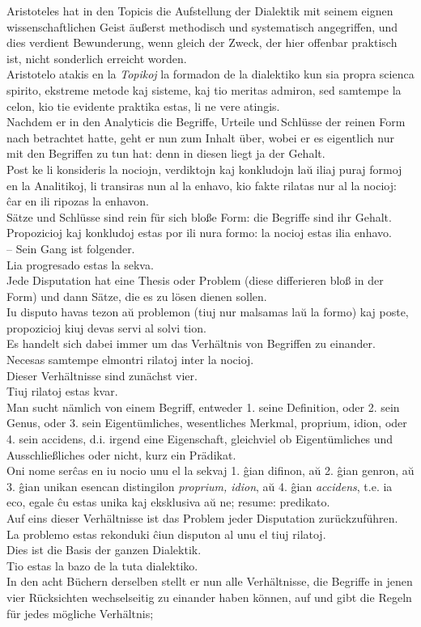 \documentclass{book}
\newcommand{\de}[1]{{\color{red}#1}\\}
\newcommand{\eo}[1]{#1\\}
\newcommand{\eble}[1]{{\color{blue}#1}}
\begin{document}
\de{Aristoteles hat in den Topicis die Aufstellung der Dialektik mit
seinem eignen wissenschaftlichen Geist äußerst methodisch und
systematisch angegriffen, und dies verdient Bewunderung, wenn gleich der
Zweck, der hier offenbar praktisch ist, nicht sonderlich erreicht
worden.}
\eo{Aristotelo atakis en la \textit{Topikoj} la formadon de la dialektiko
kun sia propra scienca spirito, ekstreme metode kaj sisteme, kaj tio
meritas admiron, sed samtempe la celon, kio tie evidente
praktika estas, li ne vere atingis.}
\de{Nachdem er in den Analyticis die Begriffe, Urteile und Schlüsse der
reinen Form nach betrachtet hatte, geht er nun zum Inhalt über, wobei er
es eigentlich nur mit den Begriffen zu tun hat: denn in diesen liegt ja
der Gehalt.}
\eo{Post ke li konsideris la nociojn, verdiktojn kaj konkludojn laŭ iliaj
puraj formoj en la Analitikoj, li transiras nun al la enhavo, kio fakte
rilatas nur al la nocioj: ĉar en ili \eble{ripozas} la enhavon.}
\de{Sätze und Schlüsse sind rein für sich bloße Form: die Begriffe sind
ihr Gehalt.}
\eo{Propozicioj kaj konkludoj estas por ili nura formo: la nocioj estas
ilia enhavo.}
\de{– Sein Gang ist folgender.}
\eo{Lia progresado estas la sekva.}
\de{Jede Disputation hat eine Thesis oder Problem (diese differieren bloß
in der Form) und dann Sätze, die es zu lösen dienen sollen.}
\eo{Iu disputo havas tezon aŭ problemon (tiuj nur malsamas \eble{laŭ} la
formo) kaj poste, propozicioj kiuj devas servi al solvi tion.}
\de{Es handelt sich dabei immer um das Verhältnis von Begriffen zu
einander.}
\eo{Necesas samtempe elmontri rilatoj inter la nocioj.}
\de{Dieser Verhältnisse sind zunächst vier.}
\eo{Tiuj rilatoj estas kvar.}
\de{Man sucht nämlich von einem Begriff, entweder 1. seine Definition,
oder 2. sein Genus, oder 3. sein Eigentümliches, wesentliches Merkmal,
proprium, idion, oder 4. sein accidens, d.i. irgend eine Eigenschaft,
gleichviel ob Eigentümliches und Ausschließliches oder nicht, kurz ein
Prädikat.}
\eo{Oni nome serĉas en iu nocio \eble{unu el la sekvaj} 1. ĝian difinon,
aŭ 2. ĝian genron, aŭ 3. ĝian unikan esencan distingilon
\textit{proprium, idion}, aŭ 4. ĝian \textit{accidens}, t.e. ia eco,
egale ĉu estas unika kaj eksklusiva aŭ ne; resume: predikato.}
\de{Auf eins dieser Verhältnisse ist das Problem jeder Disputation
zurückzuführen.}
\eo{La problemo estas rekonduki ĉiun disputon al unu el tiuj rilatoj.}
\de{Dies ist die Basis der ganzen Dialektik.}
\eo{Tio estas la bazo de la tuta dialektiko.}
\de{In den acht Büchern derselben stellt er nun alle Verhältnisse, die
Begriffe in jenen vier Rücksichten wechselseitig zu einander haben
können, auf und gibt die Regeln für jedes mögliche Verhältnis;}
\end{document}
